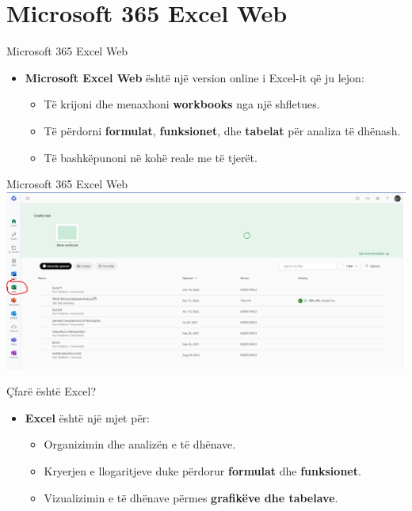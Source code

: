 \documentclass[
  ignorenonframetext,
]{beamer}
\begin{document}
\section{Microsoft 365 Excel Web}\label{microsoft-365-excel-web}

\begin{frame}{Microsoft 365 Excel Web}
\label{microsoft-365-excel-web-1}
\begin{itemize}
\item
  \textbf{Microsoft Excel Web} është një version online i Excel-it që ju
  lejon:

  \begin{itemize}
  \item
    Të krijoni dhe menaxhoni \textbf{workbooks} nga një shfletues.
  \item
    Të përdorni \textbf{formulat}, \textbf{funksionet}, dhe
    \textbf{tabelat} për analiza të dhënash.
  \item
    Të bashkëpunoni në kohë reale me të tjerët.
  \end{itemize}
\end{itemize}
\end{frame}

\begin{frame}{Microsoft 365 Excel Web}
\label{microsoft-365-excel-web-2}
\includegraphics{./images/excel1.png}
\end{frame}

\begin{frame}{Çfarë është Excel?}
\label{uxe7faruxeb-uxebshtuxeb-excel}
\begin{itemize}
\item
  \textbf{Excel} është një mjet për:

  \begin{itemize}
  \item
    Organizimin dhe analizën e të dhënave.
  \item
    Kryerjen e llogaritjeve duke përdorur \textbf{formulat} dhe
    \textbf{funksionet}.
  \item
    Vizualizimin e të dhënave përmes \textbf{grafikëve dhe tabelave}.
  \end{itemize}
\end{itemize}
\end{frame}
\end{document}
